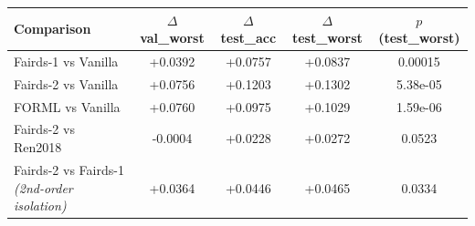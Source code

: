 \begin{tabular}{lcccc}
\toprule
Comparison & $\Delta$ val\_worst & $\Delta$ test\_acc & $\Delta$ test\_worst & $p$ (test\_worst) \\
\midrule
Fairds-1 vs Vanilla & +0.0392 & +0.0757 & +0.0837 & 0.00015 \\
Fairds-2 vs Vanilla & +0.0756 & +0.1203 & +0.1302 & 5.38e-05 \\
FORML vs Vanilla & +0.0760 & +0.0975 & +0.1029 & 1.59e-06 \\
Fairds-2 vs Ren2018 & -0.0004 & +0.0228 & +0.0272 & 0.0523 \\
Fairds-2 vs Fairds-1 \emph{(2nd-order isolation)} & +0.0364 & +0.0446 & +0.0465 & 0.0334 \\
\bottomrule
\end{tabular}